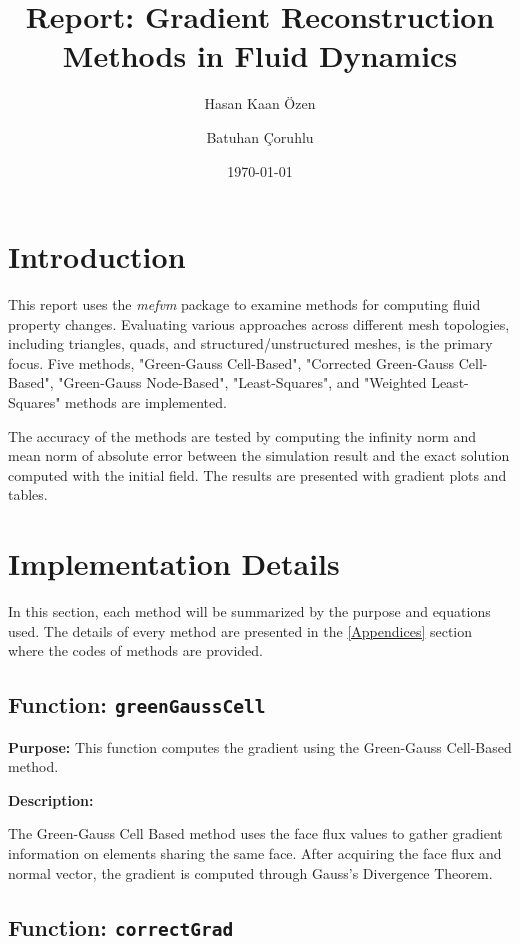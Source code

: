 \documentclass{article}
\title{Report: Gradient Reconstruction Methods in Fluid Dynamics}
\author{Hasan Kaan Özen \and Batuhan Çoruhlu}
\date{\today}
\begin{document}
\maketitle
\tableofcontents
\newpage

\section{Introduction}

This report uses the \textit{mefvm} package to examine methods for computing fluid property changes. Evaluating various approaches across different mesh topologies, including triangles, quads, and structured/unstructured meshes, is the primary focus. Five methods, "Green-Gauss Cell-Based", "Corrected Green-Gauss Cell-Based", "Green-Gauss Node-Based", "Least-Squares", and "Weighted Least-Squares" methods are implemented.

The accuracy of the methods are tested by computing the infinity norm and mean norm of absolute error between the simulation result and the exact solution computed with the initial field. The results are presented with gradient plots and tables.

\section{Implementation Details}
In this section, each method will be summarized by the purpose and equations used. The details of every method are presented in the \ref{Appendices} section where the codes of methods are provided.

\subsection{Function: \texttt{greenGaussCell}}

\textbf{Purpose:} This function computes the gradient using the Green-Gauss Cell-Based method.


\textbf{Description:}

The Green-Gauss Cell Based method uses the face flux values to gather gradient information on elements sharing the same face. After acquiring the face flux and normal vector, the gradient is computed through Gauss's Divergence Theorem.



\subsection{Function: \texttt{correctGrad}}
\end{document}

